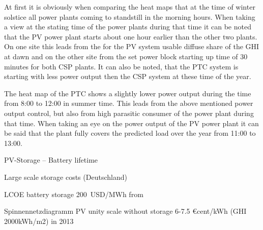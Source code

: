 At first it is obviously when comparing the heat maps that at the time of winter solstice all power plants coming to standstill in the morning hours. When taking a view at the stating time of the power plants during that time it can be noted that the PV power plant starts about one hour earlier than the other two plants. On one site this leads from the for the PV system usable diffuse share of the GHI at dawn and on the other site from the set power block starting up time of 30 minutes for both CSP plants. It can also be noted, that the PTC system is starting with less power output then the CSP system at these time of the year.

The heat map of the PTC shows a slightly lower power output during the time from 8:00 to 12:00 in summer time. This leads from the above mentioned power output control, but also from high parasitic consumer of the power plant during that time. When taking an eye on the power output of the PV power plant it can be said that the plant fully covers the predicted load over the year from 11:00 to 13:00.

PV-Storage -- Battery lifetime

Large scale storage costs (Deutschland)

LCOE battery storage 200~USD/MWh from \cite{Corcuera2015}

Spinnennetzdiagramm 
PV unity scale without storage 
6-7.5 €cent/kWh (GHI 2000kWh/m2) in 2013 \cite{FraunhoferISE2013}\\\\

